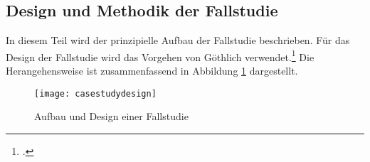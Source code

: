 \subsection{Design und Methodik der Fallstudie} \label{toc:fallstudiendesign}

In diesem Teil wird der prinzipielle Aufbau der Fallstudie beschrieben. Für das Design der Fallstudie wird das Vorgehen von
Göthlich verwendet.\footcite[Vgl.][]{gothlich2003fallstudien} Die Herangehensweise ist zusammenfassend in Abbildung
\ref{figure:casestudydesign} dargestellt.

\begin{figure}[H]
    \caption{Aufbau und Design einer Fallstudie}
    \texttt{[image: casestudydesign]}
    \label{figure:casestudydesign}
    \\
    \cite[Quelle: In Anlehnung an][S. 8ff]{gothlich2003fallstudien}
\end{figure}

